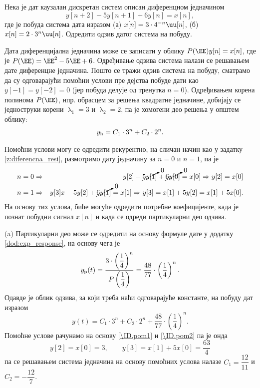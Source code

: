 \PID
Нека је дат каузалан дискретан систем описан диференцном једначином 
$$y[n+2] - 5 y[n+1] + 6 y[n] = x[n],$$ где је побуда система 
дата изразом (а) $x[n] = 3\cdot 4^{-n} \uu[n]$, (б) $x[n] = 2 \cdot 3^n \uu[n]$. Одредити одзив датог система на побуду.     

\RESENJE 
Дата диференцијална једначина може се записати у облику 
$P(\EE) y[n] = x[n]$, где је $P(\EE) = \EE^2 - 5\EE + 6$. 
Одређивање одзива система налази се решавањем дате диференцне једначина. Пошто се тражи одзив система на побуду, 
сматрамо да су одговарајући помоћни услови пре дејства побуде дати као $y[-1] = y[-2] = 0$ (јер побуда делује од 
тренутка $n=0$). Одређивањем корена полинома $P(\EE)$, нпр. обрасцем за решења квадратне једначине, добијају се 
једноструки корени $\uplambda_1 = 3$ и $\uplambda_2 = 2$, па је хомогени део решења у општем облику:
\begin{eqnarray}
    y_{\rm h} = C_1 \cdot 3^n + C_2 \cdot 2^n.
\end{eqnarray}

Помоћни услови могу се одредити рекурентно, на сличан начин као у задатку \ref{z:diferencna_resi}, размотримо дату једначину за $n = 0$ и $n = 1$, па је 
\begin{eqnarray}
    n=0 &\Rightarrow& y[2] - \cancelto{0}{5 y[1]} + \cancelto{0}{6 y[0]} = x[0] \Rightarrow y[2] = x[0] \label{\ID.pom1}
    \\ 
    n=1 &\Rightarrow& y[3] x- 5y[2] + \cancelto{0}{6y[1]} = x[1] \Rightarrow y[3] = x[1] + 5 y[2] = x[1] + 5 x[0]. \label{\ID.pom2}
\end{eqnarray}
На основу тих услова, биће могуће одредити потребне коефицијенте, када је познат побудни сигнал $x[n]$ и када се одреди партикуларни део одзива.



(a) Партикуларни део може се одредити на основу формуле дате у додатку \ref{dod:exp_response}, на основу чега је 
\begin{eqnarray}
    y_{\rm p}(t) = \dfrac{3 \cdot \left( \dfrac14 \right)^n }{ P\left( \dfrac14 \right) } = \dfrac{48}{77} \cdot \left( \dfrac14 \right)^n.
\end{eqnarray}
Одавде је облик одзива, за који треба наћи одговарајуће константе, на побуду дат изразом 
\begin{equation}
    y(t) = C_1 \cdot 3^n + C_2 \cdot 2^n +  \dfrac{48}{77} \cdot \left( \dfrac14 \right)^n.
\end{equation}
Помоћне услове рачунамо на основу \eqref{\ID.pom1} и \eqref{\ID.pom2} па је онда 
\begin{equation}
    y[2] = x[0] = 3, \qquad y[3] = x[1] + 5x[0] = \dfrac{63}{4}   
\end{equation}
па се решавањем система једначина на основу помоћних услова налазе $C_1 = \dfrac{12}{11}$ и $C_2 = -\dfrac{12}{7}$.

